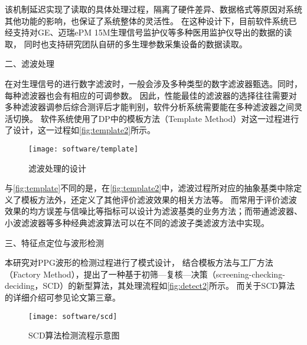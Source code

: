 该机制延迟实现了读取的具体处理过程，隔离了硬件差异、数据格式等原因对系统其他功能的影响，也保证了系统整体的灵活性。
在这种设计下，目前软件系统已经支持对GE、迈瑞ePM 15M生理信号监护仪等多种医用监护仪导出的数据的读取，
同时也支持研究团队自研的多生理参数采集设备的数据读取。

二、滤波处理

在对生理信号的进行数字滤波时，一般会涉及多种类型的数字滤波器甄选。同时，每种滤波器也会有相应的可调参数。
因此，性能最佳的滤波器的选择往往需要对多种滤波器调参后综合测评后才能判别，软件分析系统需要能在多种滤波器之间灵活切换。
软件系统使用了DP中的模板方法（Template Method）对这一过程进行了设计\cite{Enrich2018}，这一过程如\autoref{fig:template2}所示。
\begin{figure}[htbp]
    \centering
    \texttt{[image: software/template]}
    \caption{\label{fig:template2}滤波处理的设计}
\end{figure}


与\autoref{fig:template}不同的是，在\autoref{fig:template2}中，滤波过程所对应的抽象基类中除定义了模板方法外，还定义了其他评价滤波效果的相关方法等。
而常用于评价滤波效果的均方误差与信噪比等指标可以设计为滤波基类的业务方法；而带通滤波器、小波滤波器等多种经典滤波算法可以在不同的滤波子类滤波方法中实现。

三、特征点定位与波形检测

本研究对PPG波形的检测过程进行了模式设计，
结合模板方法与工厂方法（Factory Method）\cite{Enrich2018}，提出了一种基于初筛—复核—决策（screening-checking-deciding，SCD）的新型算法，其处理流程如\autoref{fig:detect2}所示。
而关于SCD算法的详细介绍可参见论文第三章。
\begin{figure}[htbp]
    \centering
    \texttt{[image: software/scd]}
    \caption{\label{fig:detect2}SCD算法检测流程示意图}
\end{figure}

